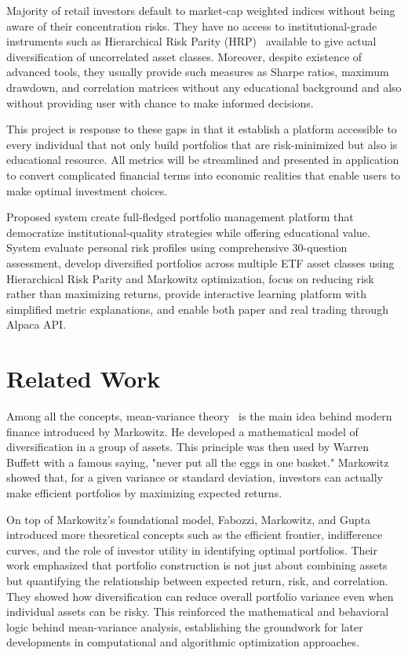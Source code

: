 \documentclass[11pt]{article}
\begin{document}
Majority of retail investors default to market-cap weighted indices without being aware of their concentration risks. They have no access to institutional-grade instruments such as Hierarchical Risk Parity (HRP)~\cite{hrp2016,kalytis2024optimizing} available to give actual diversification of uncorrelated asset classes. Moreover, despite existence of advanced tools, they usually provide such measures as Sharpe ratios, maximum drawdown, and correlation matrices without any educational background and also without providing user with chance to make informed decisions.

This project is response to these gaps in that it establish a platform accessible to every individual that not only build portfolios that are risk-minimized but also is educational resource. All metrics will be streamlined and presented in application to convert complicated financial terms into economic realities that enable users to make optimal investment choices.

Proposed system create full-fledged portfolio management platform that democratize institutional-quality strategies while offering educational value. System evaluate personal risk profiles using comprehensive 30-question assessment, develop diversified portfolios across multiple ETF asset classes using Hierarchical Risk Parity and Markowitz optimization, focus on reducing risk rather than maximizing returns, provide interactive learning platform with simplified metric explanations, and enable both paper and real trading through Alpaca API.


\section{Related Work}

Among all the concepts, mean-variance theory~\cite{markowitz1952} is the main idea behind modern finance introduced by Markowitz. He developed a mathematical model of diversification in a group of assets. This principle was then used by Warren Buffett with a famous saying, "never put all the eggs in one basket." Markowitz showed that, for a given variance or standard deviation, investors can actually make efficient portfolios by maximizing expected returns.

On top of Markowitz's foundational model, Fabozzi, Markowitz, and Gupta~\cite{fabozzi2008portfolio} introduced more theoretical concepts such as the efficient frontier, indifference curves, and the role of investor utility in identifying optimal portfolios. Their work emphasized that portfolio construction is not just about combining assets but quantifying the relationship between expected return, risk, and correlation. They showed how diversification can reduce overall portfolio variance even when individual assets can be risky. This reinforced the mathematical and behavioral logic behind mean-variance analysis, establishing the groundwork for later developments in computational and algorithmic optimization approaches.
\end{document}
